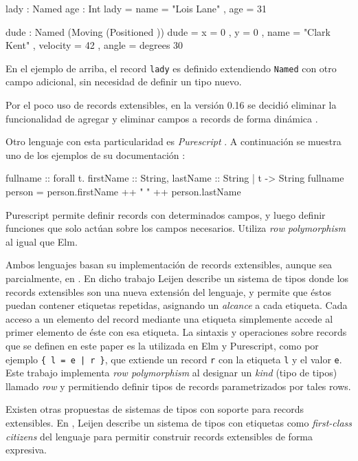 \begin{code}
lady : Named { age : Int }
lady =
  { name = "Lois Lane"
  , age = 31 
  }

dude : Named (Moving (Positioned {}))
dude =
  { x = 0
  , y = 0
  , name = "Clark Kent"
  , velocity = 42
  , angle = degrees 30
  }
\end{code}

En el ejemplo de arriba, el record \texttt{lady} es definido extendiendo \texttt{Named} con otro campo adicional, sin necesidad de definir un tipo nuevo.

Por el poco uso de records extensibles, en la versión 0.16 se decidió eliminar la funcionalidad de agregar y eliminar campos a records de forma dinámica \cite{ElmReducedRecordSyntax}.

Otro lenguaje con esta particularidad es \textit{Purescript} \cite{PurescriptByExample}. A continuación se muestra uno de los ejemplos de su documentación \cite{PurescriptRecords}:

\begin{code}
fullname :: forall t. { firstName :: String,
  lastName :: String | t } -> String
fullname person = person.firstName ++ " " ++ 
  person.lastName
\end{code}

Purescript permite definir records con determinados campos, y luego definir funciones que solo actúan sobre los campos necesarios. Utiliza \textit{row polymorphism} al igual que Elm.

Ambos lenguajes basan su implementación de records extensibles, aunque sea parcialmente, en \cite{Leijen:scopedlabels}. En dicho trabajo Leijen describe un sistema de tipos donde los records extensibles son una nueva extensión del lenguaje, y permite que éstos puedan contener etiquetas repetidas, asignando un \textit{alcance} a cada etiqueta. Cada acceso a un elemento del record mediante una etiqueta simplemente accede al primer elemento de éste con esa etiqueta. La sintaxis y operaciones sobre records que se definen en este paper es la utilizada en Elm y Purescript, como por ejemplo \texttt{\{ l = e | r \}}, que extiende un record \texttt{r} con la etiqueta \texttt{l} y el valor \texttt{e}. Este trabajo implementa \textit{row polymorphism} al designar un \textit{kind} (tipo de tipos) llamado \textit{row} y permitiendo definir tipos de records parametrizados por tales rows.

Existen otras propuestas de sistemas de tipos con soporte para records extensibles. En \cite{Leijen:fclabels}, Leijen describe un sistema de tipos con etiquetas como \textit{first-class citizens} del lenguaje para permitir construir records extensibles de forma expresiva. 

